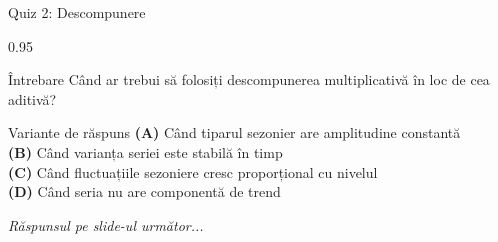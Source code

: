\documentclass[9pt, aspectratio=169, t]{beamer}
\begin{document}
\begin{frame}{Quiz 2: Descompunere}
    \begin{cminipage}{0.95\textwidth}
    \begin{alertblock}{Întrebare}
        Când ar trebui să folosiți descompunerea multiplicativă în loc de cea aditivă?
    \end{alertblock}

    \vspace{0.4cm}

    \begin{block}{Variante de răspuns}
        \textcolor{MainBlue}{\textbf{(A)}} Când tiparul sezonier are amplitudine constantă\\[3pt]
        \textcolor{MainBlue}{\textbf{(B)}} Când varianța seriei este stabilă în timp\\[3pt]
        \textcolor{MainBlue}{\textbf{(C)}} Când fluctuațiile sezoniere cresc proporțional cu nivelul\\[3pt]
        \textcolor{MainBlue}{\textbf{(D)}} Când seria nu are componentă de trend
    \end{block}

    \vspace{0.5cm}

    \begin{center}
        \textit{Răspunsul pe slide-ul următor...}
    \end{center}
    \end{cminipage}
\end{frame}
\end{document}
